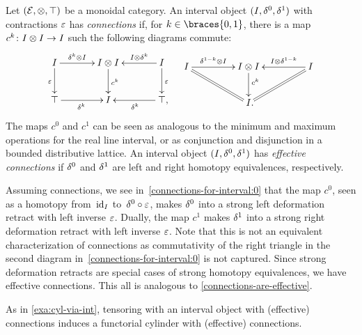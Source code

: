 \documentclass[reqno,10pt,a4paper,oneside,draft]{amsart}
\begin{document}
\begin{example} \label{exa:connections-for-interval}
Let $(\mathcal{E}, \otimes, \top)$ be a monoidal category.
An interval object $(I, \delta^0, \delta^1)$ with contractions $\varepsilon$ has \emph{connections} if, for $k \in \braces{0, 1}$, there is a map $c^k \colon I \otimes I \to I$ such the following diagrams commute:
\begin{align} \label{connections-for-interval:0}
\begin{aligned}
\xymatrix@C+1em{
  \interval
  \ar[r]^-{\kcyl \otimes \interval}
  \ar[d]_{\ccyl}
&
  \interval \otimes \interval
  \ar[d]^{c^k}
&
  \interval
  \ar[l]_-{\interval \otimes \kcyl}
  \ar[d]^{\ccyl}
\\
  \top
  \ar[r]_{\kcyl}
&
  \interval
&
  \top
  \ar[l]^{\kcyl}
\rlap{,}}
\end{aligned}
&&
\begin{aligned}
\xymatrix@C+2em{
  \interval
  \ar[r]^-{\kcylinv \otimes \interval}
  \ar@{=}[dr]
&
  \interval \otimes \interval
  \ar[d]^(0.4){c^k}
&
  \interval
  \ar[l]_-{\interval \otimes \kcylinv}
  \ar@{=}[dl]
\\&
  \interval
\rlap{.}}
\end{aligned}
\end{align}
The maps $c^0$ and $c^1$ can be seen as analogous to the minimum and maximum operations for the real line interval, or as conjunction and disjunction in a bounded distributive lattice.
An interval object $(I, \delta^0, \delta^1)$ has \emph{effective connections} if $\delta^0$ and $\delta^1$ are left and right homotopy equivalences, respectively.

Assuming connections, we see in~\eqref{connections-for-interval:0} that the map $c^0$, seen as a homotopy from~$\operatorname{id}_I$ 
to~$\delta^0 \mathbin{\circ} \varepsilon$, makes $\delta^0$ into a strong left deformation retract with left inverse $\varepsilon$.
Dually, the map $c^1$ makes $\delta^1$ into a strong right deformation retract with left inverse $\varepsilon$.
Note that this is not an equivalent characterization of connections as commutativity of the right triangle in the second diagram in~\eqref{connections-for-interval:0} is not captured.
Since strong deformation retracts are special cases of strong homotopy equivalences, we have effective connections.
This all is analogous to \cref{connections-are-effective}.

As in \cref{exa:cyl-via-int}, tensoring with an interval object with (effective) connections induces a functorial cylinder with (effective) connections.
\end{example}
\end{document}
